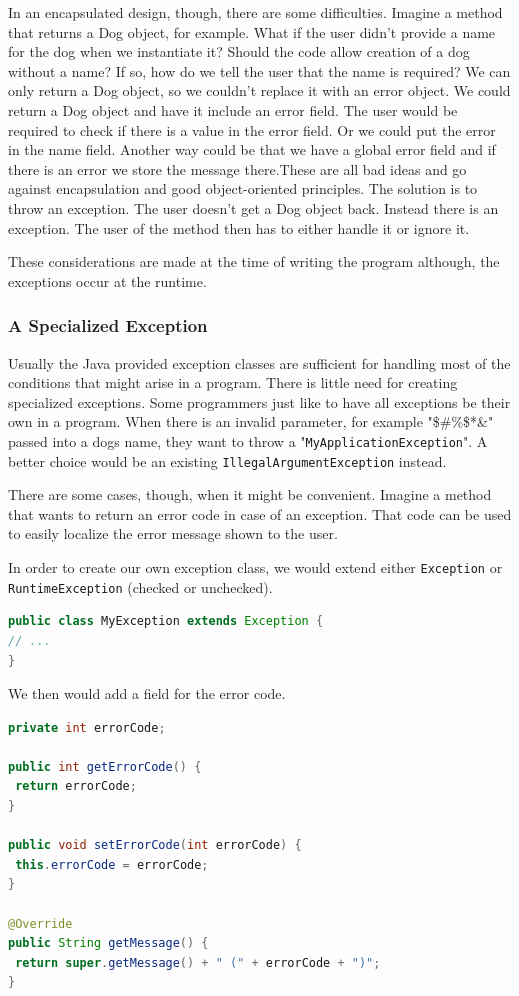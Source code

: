 In an encapsulated design, though, there are some difficulties. Imagine a method that returns a Dog object, for example. What if the user didn't provide a name for the dog when we instantiate it? Should the code allow creation of a dog without a name? If so, how do we tell the user that the name is required? We can only return a Dog object, so we couldn't replace it with an error object. We could return a Dog object and have it include an error field. The user would be required to check if there is a value in the error field. Or we could put the error in the name field. Another way could be that we have a global error field and if there is an error we store the message there.These are all bad ideas and go against encapsulation and good object-oriented principles. The solution is to throw an exception. The user doesn't get a Dog object back. Instead there is an exception. The user of the method then has to either handle it or ignore it.

These considerations are made at the time of writing the program although, the exceptions occur at the runtime.

\subsubsection{A Specialized Exception}
Usually the Java provided exception classes are sufficient for handling most of the conditions that might arise in a program. There is little need for creating specialized exceptions. Some programmers just like to have all exceptions be their own in a program. When there is an invalid parameter, for example "\@\$\#\%\$*\&" passed into a dogs name, they want to  throw a "\texttt{MyApplicationException}". A better choice would be an existing  \texttt{IllegalArgumentException} instead.

There are some cases, though, when it might be convenient. Imagine a method that wants to return an error code in case of an exception. That code can be used to easily localize the error message shown to the user. 

In order to create our own exception class, we would extend either \texttt{Exception} or \texttt{RuntimeException} (checked or unchecked).
\begin{lstlisting}[language=Java]
public class MyException extends Exception {
// ...
}
\end{lstlisting}

We then would add a field for the error code. 
\begin{lstlisting}[language=Java]
private int errorCode;

public int getErrorCode() {
 return errorCode;
}

public void setErrorCode(int errorCode) {
 this.errorCode = errorCode;
}

@Override
public String getMessage() {
 return super.getMessage() + " (" + errorCode + ")";
}
\end{lstlisting}

